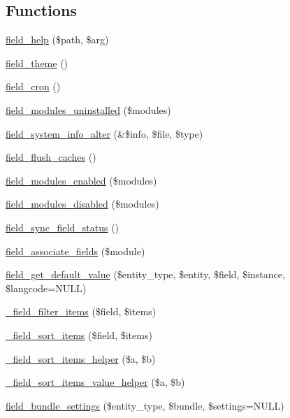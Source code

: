 \subsection*{Functions}
\begin{DoxyCompactItemize}
\item 
\hyperlink{group__field_ga8a225102daf78db5ed14900af54e795a}{field\_\-help} (\$path, \$arg)
\item 
\hyperlink{group__field_ga1babb2e6f8b678938c3834f2df5240d4}{field\_\-theme} ()
\item 
\hyperlink{group__field_ga146e4e160374875d10cdf1fdcaf688e3}{field\_\-cron} ()
\item 
\hyperlink{group__field_gacc7e883a1a3d5103fe4284be28547450}{field\_\-modules\_\-uninstalled} (\$modules)
\item 
\hyperlink{group__field_ga5b151da09ab45e0f72989bc7bb6acc79}{field\_\-system\_\-info\_\-alter} (\&\$info, \$file, \$type)
\item 
\hyperlink{group__field_ga756e79c6b9be66a9ea28b6d9c97a4ad9}{field\_\-flush\_\-caches} ()
\item 
\hyperlink{group__field_ga9cc8250f001fdb464340cbf7a0e548af}{field\_\-modules\_\-enabled} (\$modules)
\item 
\hyperlink{group__field_ga608c655389025a251db0881706d70d59}{field\_\-modules\_\-disabled} (\$modules)
\item 
\hyperlink{group__field_ga8b6774c994bfbdd751d0e0aa83facfce}{field\_\-sync\_\-field\_\-status} ()
\item 
\hyperlink{group__field_gaf3444a608af81b62af5be3dbc72a7d7d}{field\_\-associate\_\-fields} (\$module)
\item 
\hyperlink{group__field_gac80e479e60b75dd09dfb706e04c05899}{field\_\-get\_\-default\_\-value} (\$entity\_\-type, \$entity, \$field, \$instance, \$langcode=NULL)
\item 
\hyperlink{group__field_gabff946d3aa40a032f913ad2f336cbd05}{\_\-field\_\-filter\_\-items} (\$field, \$items)
\item 
\hyperlink{group__field_ga8ce2774a8371d5435ef06e13bfc93246}{\_\-field\_\-sort\_\-items} (\$field, \$items)
\item 
\hyperlink{group__field_gae7d9330807ba1d474f79b67a3dae6113}{\_\-field\_\-sort\_\-items\_\-helper} (\$a, \$b)
\item 
\hyperlink{group__field_ga45c6b3ea588e59013c78e1b74e1b94a5}{\_\-field\_\-sort\_\-items\_\-value\_\-helper} (\$a, \$b)
\item 
\hyperlink{group__field_gab6416216c1491d34f1bdc7ce38abfe8c}{field\_\-bundle\_\-settings} (\$entity\_\-type, \$bundle, \$settings=NULL)

\end{DoxyCompactItemize}
